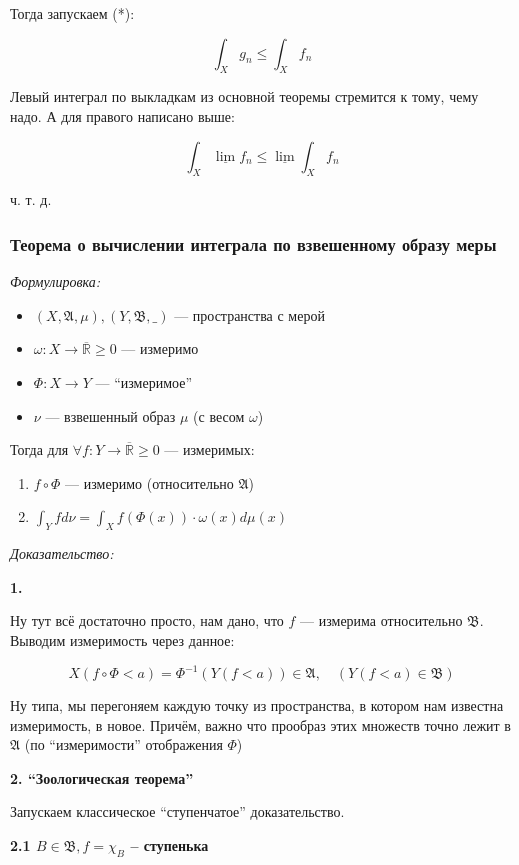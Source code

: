 \documentclass{article}
\def\rinf{\overline{\mathbb{R}}}
\begin{document}
Тогда запускаем (*):

\[\int_{X} g_n \le \int_{X} f_n\]

Левый интеграл по выкладкам из основной теоремы стремится к тому, чему надо. А для правого написано выше:

\[\int_{X} \underline{\lim}f_n \le \underline{\lim}\int_{X} f_n\]

ч. т. д. 

\subsubsection{Теорема о вычислении интеграла по взвешенному образу меры}
\textit{Формулировка:}

\begin{itemize}
    \item $(X, \mathfrak{A}, \mu), (Y, \mathfrak{B}, \_)$ --- пространства с мерой
    \item $\omega: X \rightarrow \rinf \ge 0$ --- измеримо
    \item $\Phi: X \rightarrow Y$ --- ``измеримое''
    \item $\nu$ --- взвешенный образ $\mu$ (с весом $\omega$)
\end{itemize}

Тогда для $\forall f: Y \rightarrow \rinf \ge 0$ --- измеримых:
\begin{enumerate}
    \item $f \circ \Phi$ --- измеримо (относительно $\mathfrak{A}$)
    \item $\int_{Y} f d\nu = \int_{X} f(\Phi(x))\cdot\omega(x) d\mu(x)$
\end{enumerate}
\textit{Доказательство:}

\textbf{1.}

Ну тут всё достаточно просто, нам дано, что $f$ --- измерима относительно $\mathfrak{B}$. Выводим измеримость через данное:

\[X(f \circ \Phi < a) = \Phi^{-1}(Y(f < a)) \in \mathfrak{A}, \quad (Y(f < a) \in \mathfrak{B})\]

Ну типа, мы перегоняем каждую точку из пространства, в котором нам известна измеримость, в новое. Причём, важно что прообраз этих множеств точно лежит в $\mathfrak{A}$ (по ``измеримости'' отображения $\Phi$)

\textbf{2. ``Зоологическая теорема'' }

Запускаем классическое ``ступенчатое'' доказательство.

\textbf{2.1 $B \in \mathfrak{B}, f = \chi_{B}$ -- ступенька}
\end{document}

